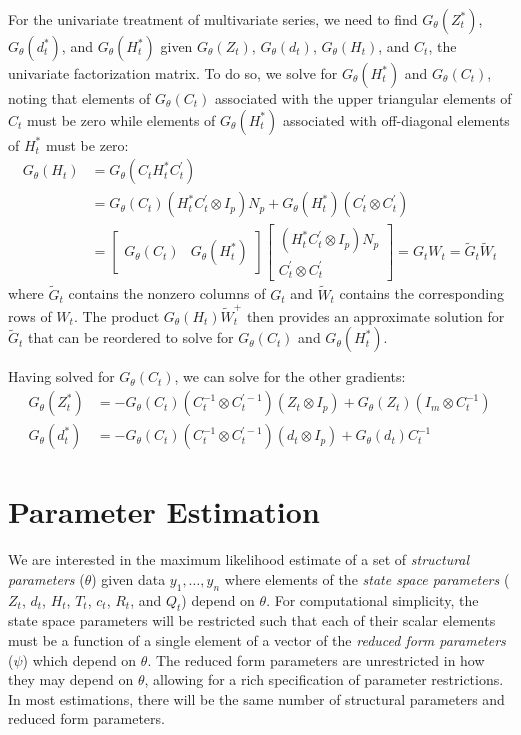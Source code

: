 \documentclass[12pt]{article}
\newcommand{\Gt}{G_\theta}
\begin{document}
	For the univariate treatment of multivariate series, we need to find $\Gt(Z_t^*)$, $\Gt(d_t^*)$, and $\Gt(H_t^*)$ given $\Gt(Z_t)$, $\Gt(d_t)$, $\Gt(H_t)$, and $C_t$, the univariate factorization matrix. To do so, we  solve for $\Gt(H_t^*)$ and $\Gt(C_t)$, noting that elements of $\Gt(C_t)$ associated with the upper triangular elements of $C_t$ must be zero while elements of $\Gt(H_t^*)$ associated with off-diagonal elements of $H_t^*$ must be zero: 
	\begin{align*}
	\Gt(H_t) &= \Gt(C_t H_t^* C_t^\prime) \\
	&= \Gt(C_t)(H_t^* C_t^\prime \otimes I_p) N_p + \Gt(H_t^*)(C_t^\prime \otimes C_t^\prime) \\
	&= \begin{bmatrix} \Gt(C_t) & \Gt(H_t^*) \end{bmatrix} \begin{bmatrix} (H_t^* C_t^\prime \otimes I_p) N_p \\ C_t^\prime \otimes C_t^\prime \end{bmatrix} 
	= G_t W_t
	= \tilde{G}_t \tilde{W}_t
	\end{align*}
	where $\tilde{G}_t$ contains the nonzero columns of $G_t$ and $\tilde{W}_t$ contains the corresponding rows of $W_t$. The product $\Gt(H_t) \tilde{W}_t^+$ then provides an approximate solution for $\tilde{G}_t$ that can be reordered to solve for $\Gt(C_t)$ and $\Gt(H_t^*)$.

	Having solved for $\Gt(C_t)$, we can solve for the other gradients: 
	\begin{align*} 
	\Gt(Z_t^*) &= -\Gt(C_t)(C_t^{-1} \otimes C_t^{\prime-1})(Z_t \otimes I_p) + \Gt(Z_t)(I_m \otimes C_t^{-1}) \\
	\Gt(d_t^*) &= -\Gt(C_t)(C_t^{-1} \otimes C_t^{\prime-1})(d_t \otimes I_p) + \Gt(d_t)C_t^{-1}
	\end{align*}

\newpage
\section{Parameter Estimation}
	\label{sec:parameter_estimation}
	We are interested in the maximum likelihood estimate of a set of \emph{structural parameters} ($\theta$) given data $y_1, \dots, y_n$ where elements of the \emph{state space parameters} ($Z_t$, $d_t$, $H_t$, $T_t$, $c_t$, $R_t$, and $Q_t$) depend on $\theta$. For computational simplicity, the state space parameters will be restricted such that each of their scalar elements must be a function of a single element of a vector of the \emph{reduced form parameters} ($\psi$) which depend on $\theta$. The reduced form parameters are unrestricted in how they may depend on $\theta$, allowing for a rich specification of parameter restrictions. In most estimations, there will be the same number of structural parameters and reduced form parameters. 
\end{document}
